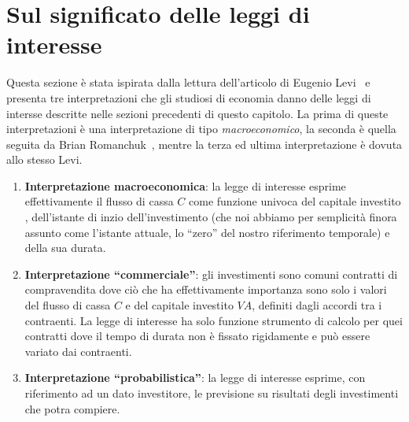 \section{Sul significato delle leggi di interesse}
\label{sec:significato}

Questa sezione è stata ispirata dalla lettura dell'articolo di Eugenio Levi~\cite{Levi1957} e presenta tre interpretazioni che gli studiosi di economia
danno delle leggi di intersse descritte nelle sezioni precedenti di questo capitolo. La prima di queste interpretazioni è una interpretazione di tipo
\emph{macroeconomico}, la seconda è quella seguita da Brian Romanchuk~\cite{Romanchuk2021}, mentre la terza ed ultima interpretazione è dovuta allo
stesso Levi.
\begin{enumerate}
\item \textbf{Interpretazione macroeconomica}: la legge di interesse esprime effettivamente il flusso di cassa $C$ come funzione univoca del capitale investito
  \VA, dell'istante di inzio dell'investimento (che noi abbiamo per semplicità finora assunto come l'istante attuale, lo ``zero'' del nostro riferimento
  temporale) e della sua durata.
\item \textbf{Interpretazione ``commerciale''}\footnotemark{}: gli investimenti sono comuni contratti di compravendita dove ciò che ha effettivamente importanza sono
  solo i valori del flusso di cassa $C$ e del capitale investito $VA$, definiti dagli accordi tra i contraenti. La legge di interesse ha solo funzione
  strumento di calcolo per quei contratti dove il tempo di durata non è fissato rigidamente e può essere variato dai contraenti.
\item \textbf{Interpretazione ``probabilistica''}\footnotemark[\value{footnote}]: la legge di interesse esprime, con riferimento ad un dato investitore, le previsione su risultati degli
  investimenti che potra compiere.
\end{enumerate}

